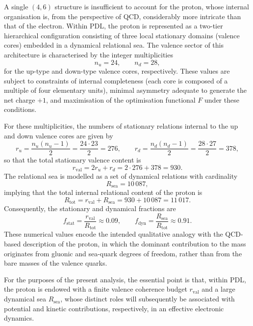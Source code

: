 \documentclass[11pt,a4paper]{article}
\begin{document}
A single $(4,6)$ structure is insufficient to account for the proton, whose internal organisation is, from the perspective of QCD, considerably more intricate than that of the electron. Within PDL, the proton is represented as a two-tier hierarchical configuration consisting of three local stationary domains (valence cores) embedded in a dynamical relational sea.\cite{Laubscher2026PDL_English,Laubscher2026LDP_French,Laubscher2026DerivationAlpha} The valence sector of this architecture is characterised by the integer multiplicities
\begin{equation}
n_u = 24, \qquad n_d = 28,
\end{equation}
for the up-type and down-type valence cores, respectively. These values are subject to constraints of internal completeness (each core is composed of a multiple of four elementary units), minimal asymmetry adequate to generate the net charge $+1$, and maximisation of the optimisation functional $F$ under these conditions.\cite{Laubscher2026LDP_French}\par For these multiplicities, the numbers of stationary relations internal to the up and down valence cores are given by
\begin{equation}
r_u = \frac{n_u(n_u-1)}{2} = \frac{24\cdot 23}{2} = 276, \qquad
r_d = \frac{n_d(n_d-1)}{2} = \frac{28\cdot 27}{2} = 378,
\end{equation}
so that the total stationary valence content is
\begin{equation}
r_{\mathrm{val}} = 2 r_u + r_d = 2\cdot 276 + 378 = 930.
\end{equation}
The relational sea is modelled as a set of dynamical relations with cardinality
\begin{equation}
R_{\mathrm{sea}} = 10\,087,
\end{equation}
implying that the total internal relational content of the proton is
\begin{equation}
R_{\mathrm{tot}} = r_{\mathrm{val}} + R_{\mathrm{sea}} = 930 + 10\,087 = 11\,017.
\end{equation}
Consequently, the stationary and dynamical fractions are
\begin{equation}
f_{\mathrm{stat}} = \frac{r_{\mathrm{val}}}{R_{\mathrm{tot}}} \approx 0.09, \qquad
f_{\mathrm{dyn}} = \frac{R_{\mathrm{sea}}}{R_{\mathrm{tot}}} \approx 0.91.
\end{equation}
These numerical values encode the intended qualitative analogy with the QCD-based description of the proton, in which the dominant contribution to the mass originates from gluonic and sea-quark degrees of freedom, rather than from the bare masses of the valence quarks.\cite{Laubscher2026PDL_English,Laubscher2026LDP_French}\par For the purposes of the present analysis, the essential point is that, within PDL, the proton is endowed with a finite valence coherence budget $r_{\mathrm{val}}$ and a large dynamical sea $R_{\mathrm{sea}}$, whose distinct roles will subsequently be associated with potential and kinetic contributions, respectively, in an effective electronic dynamics.
\end{document}
